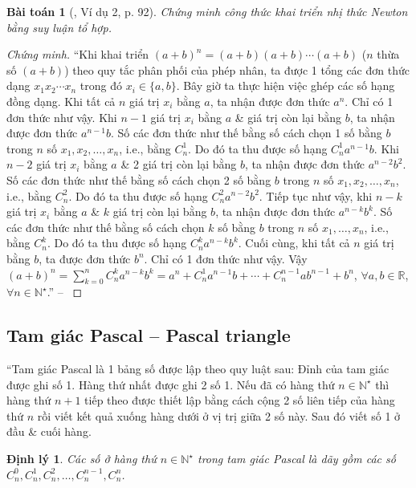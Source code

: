\documentclass[oneside]{book}
\numberwithin{equation}{section}
\newtheorem{baitoan}{Bài toán}[section]
\newtheorem{dinhly}{Định lý}[section]
\begin{document}
\begin{baitoan}[\cite{TL_chuyen_Toan_Dai_So_Giai_Tich_11}, Ví dụ 2, p. 92]
	Chứng minh công thức khai triển nhị thức Newton bằng suy luận tổ hợp.
\end{baitoan}

\begin{proof}[Chứng minh]
	``Khi khai triển $(a + b)^n = (a + b)(a + b)\cdots(a + b)$ ($n$ thừa số $(a + b)$) theo quy tắc phân phối của phép nhân, ta được 1 tổng các đơn thức dạng $x_1x_2\cdots x_n$ trong đó $x_i\in\{a,b\}$. Bây giờ ta thực hiện việc ghép các số hạng đồng dạng. Khi tất cả $n$ giá trị $x_i$ bằng $a$, ta nhận được đơn thức $a^n$. Chỉ có 1 đơn thức như vậy. Khi $n - 1$ giá trị $x_i$ bằng $a$ \& giá trị còn lại bằng $b$, ta nhận được đơn thức $a^{n-1}b$. Số các đơn thức như thế bằng số cách chọn 1 số bằng $b$ trong $n$ số $x_1,x_2,\ldots,x_n$, i.e., bằng $C_n^1$. Do đó ta thu được số hạng $C_n^1a^{n-1}b$. Khi $n - 2$ giá trị $x_i$ bằng $a$ \& 2 giá trị còn lại bằng $b$, ta nhận được đơn thức $a^{n-2}b^2$. Số các đơn thức như thế bằng số cách chọn 2 số bằng $b$ trong $n$ số $x_1,x_2,\ldots,x_n$, i.e., bằng $C_n^2$. Do đó ta thu được số hạng $C_n^2a^{n-2}b^2$. Tiếp tục như vậy, khi $n - k$ giá trị $x_i$ bằng $a$ \& $k$ giá trị còn lại bằng $b$, ta nhận được đơn thức $a^{n-k}b^k$. Số các đơn thức như thế bằng số cách chọn $k$ số bằng $b$ trong $n$ số $x_1,\ldots,x_n$, i.e., bằng $C_n^k$. Do đó ta thu được số hạng $C_n^ka^{n-k}b^k$. Cuối cùng, khi tất cả $n$ giá trị bằng $b$, ta được đơn thức $b^n$. Chỉ có 1 đơn thức như vậy. Vậy $(a + b)^n = \sum_{k=0}^n C_n^ka^{n-k}b^k = a^n + C_n^1a^{n-1}b + \cdots + C_n^{n-1}ab^{n-1} + b^n$, $\forall a,b\in\mathbb{R}$, $\forall n\in\mathbb{N}^\star$.'' -- \cite[pp. 92--93]{TL_chuyen_Toan_Dai_So_Giai_Tich_11}
\end{proof}

\subsection{Tam giác Pascal -- Pascal triangle}
``Tam giác Pascal là 1 bảng số được lập theo quy luật sau: Đỉnh của tam giác được ghi số 1. Hàng thứ nhất được ghi 2 số 1. Nếu đã có hàng thứ $n\in\mathbb{N}^\star$ thì hàng thứ $n + 1$ tiếp theo được thiết lập bằng cách cộng 2 số liên tiếp của hàng thứ $n$ rồi viết kết quả xuống hàng dưới ở vị trị giữa 2 số này. Sau đó viết số 1 ở đầu \& cuối hàng.

\begin{dinhly}
	Các số ở hàng thứ $n\in\mathbb{N}^\star$ trong tam giác Pascal là dãy gồm các số $C_n^0,C_n^1,C_n^2,\ldots,C_n^{n-1},C_n^n$.
\end{dinhly}
\end{document}
